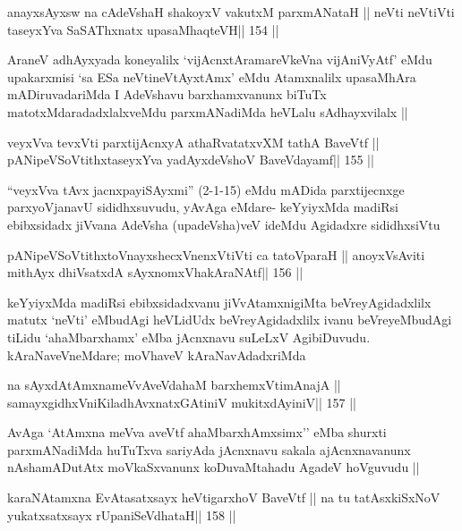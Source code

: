 \begin{shl}
anayxsAyxsw na cA\s\s deVshaH shakoyxV vakutxM parxmANataH ||
neVti neVtiVti taseyxYva SaSAThxnatx upasaMhaqteVH\hfill || 154 ||
\end{shl}

\begin{artha}
AraneV adhAyxyada koneyalilx `vijAcnxtAramareVkeVna vijAniVyAtf' eMdu
upakarxmisi `sa ESa neVtineVtAyxtAmx' eMdu Atamxnalilx
upasaMhAra mADiruvadariMda I AdeVshavu barxhamxvanunx biTuTx
matotxMdaradadxlalxveMdu parxmANadiMda heVLalu sAdhayxvilalx ||
\end{artha}

\begin{shl}
veyxVva tevxVti parxtijAcnxyA athaRvatatxvXM tathA BaveVtf ||
pANipeVSoVtithxtaseyxYva yadAyxdeVshoV BaveVdayamf\hfill || 155 ||
\end{shl}

\begin{artha}
``veyxVva tAvx jacnxpayiSAyxmi'' (2-1-15) eMdu mADida parxtijecnxge
  parxyoVjanavU sididhxsuvudu, yAvAga eMdare- keYyiyxMda madiRsi
  ebibxsidadx jiVvana AdeVsha (upadeVsha)veV ideMdu Agidadxre sididhxsiVtu
\end{artha}

\begin{shl}
pANipeVSoVtithxtoV\s nayxshecxVnenxVtiVti ca tatoV\s paraH ||
anoyxV\s sAviti mithAyx dhiVsatxdA sAyxnomxVhakAraNAtf\hfill || 156 ||
\end{shl}

\begin{artha}
keYyiyxMda madiRsi ebibxsidadxvanu jiVvAtamxnigiMta beVreyAgidadxlilx
matutx `neVti' eMbudAgi heVLidUdx beVreyAgidadxlilx ivanu
beVreyeMbudAgi tiLidu `ahaMbarxhamx' eMba jAcnxnavu suLeLxV
AgibiDuvudu. kAraNaveVneMdare; moVhaveV kAraNavAdadxriMda
\end{artha}

\begin{shl}
na sAyxdAtAmxnameVvAveVdahaM barxhemxVtimAnajA ||
samayxgidhxVniKiladhAvxnatxGAtiniV mukitxdAyiniV\hfill || 157 ||
\end{shl}

\begin{artha}
AvAga `AtAmxna meVva aveVtf ahaMbarxhAmxsimx'' eMba shurxti
parxmANadiMda huTuTxva sariyAda jAcnxnavu sakala ajAcnxnavanunx
nAshamADutAtx moVkaSxvanunx koDuvaMtahadu AgadeV hoVguvudu ||
\end{artha}

\begin{shl}
karaNAtamxna EvAtasatxsayx heVtigarxhoV BaveVtf ||
na tu tatAsxkiSxNoV yukatxsatxsayx rUpaniSeVdhataH\hfill || 158 ||
\end{shl}

